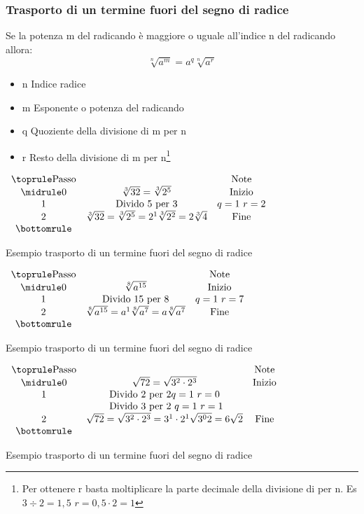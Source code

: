 \subsubsection{Trasporto di un termine fuori del segno di radice}
\label{sec:Trasportofuoriradici}
Se la potenza m del radicando è maggiore o uguale all'indice n del radicando allora:
\[\sqrt[n]{a^m}=a^q\sqrt[n]{a^r}\] 
\begin{itemize}
\item n Indice radice
\item m Esponente o potenza del radicando
\item q Quoziente della divisione di m per n
\item r Resto della divisione di m per n\footnote{Per ottenere r basta moltiplicare la parte decimale della divisione di per n. Es $3\div 2=1,5$ $r=0,5\cdot 2=1$ }
\end{itemize}
\begin{table}[H]
\centering
$
\begin{array}{ccc}
\toprule
\text{Passo} &  & \text{Note} \\
\midrule
0& \sqrt[3]{32}=\sqrt[3]{2^5} & \text{Inizio} \\ 
1 & \text{Divido } 5 \text{  per } 3 &q=1\text{  }r=2  \\ 
2&  \sqrt[3]{32}=\sqrt[3]{2^5}=2^1\sqrt[3]{2^2}=2\sqrt[3]{4}& \text{Fine} \\ 
\bottomrule 
\end{array}
$ 
\label{tab:Trasportofuoriradici1}
\caption{Esempio trasporto di un termine fuori del segno di radice}
\end{table}
\begin{table}[H]
\centering
$
\begin{array}{ccc}
\toprule
\text{Passo} &  & \text{Note} \\
\midrule
0& \sqrt[8]{a^{15}} & \text{Inizio} \\ 
1 & \text{Divido } 15 \text{  per } 8 &q=1\text{  }r=7  \\ 
2&  \sqrt[8]{a^{15}}=a^1\sqrt[8]{a^7}=a\sqrt[8]{a^7}& \text{Fine} \\ 
\bottomrule 
\end{array}
$ 
\label{tab:Trasportofuoriradici2}
\caption{Esempio trasporto di un termine fuori del segno di radice}
\end{table}
\begin{table}[H]
\centering
$
\begin{array}{ccc}
\toprule
\text{Passo} &  & \text{Note} \\
\midrule
0& \sqrt{72}=\sqrt{3^2\cdot 2^3} & \text{Inizio} \\ 
1 & \text{Divido } 2 \text{  per } 2 q=1\text{  }r=0 \\
&\text{ Divido } 3 \text{  per } 2\text{  } q=1\text{  }r=1    \\ 
2&  \sqrt{72}=\sqrt{3^2\cdot 2^3}=3^1\cdot 2^1\sqrt{3^0 2}=6\sqrt{2}& \text{Fine} \\ 
\bottomrule 
\end{array}
$ 
\label{tab:Trasportofuoriradici3}
\caption{Esempio trasporto di un termine fuori del segno di radice}
\end{table}
